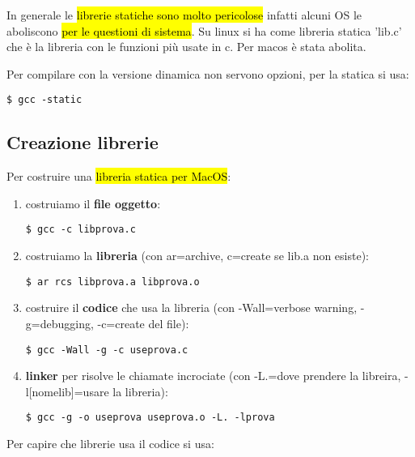 In generale le \hl{librerie statiche sono molto pericolose} infatti alcuni OS le aboliscono \hl{per le questioni di sistema}. Su linux si ha come libreria statica 'lib.c' che è la libreria con le funzioni più usate in c. Per macos è stata abolita.

Per compilare con la versione dinamica non servono opzioni, per la statica si usa:

\begin{lstlisting}
$ gcc -static
\end{lstlisting}


\subsection{Creazione librerie}

Per costruire una \hl{libreria statica per MacOS}:

\begin{enumerate}
	\item costruiamo il \textbf{file oggetto}:

\begin{lstlisting}
$ gcc -c libprova.c
\end{lstlisting}
		
	\item costruiamo la \textbf{libreria} (con ar=archive, c=create se lib.a non esiste):

\begin{lstlisting}
$ ar rcs libprova.a libprova.o
\end{lstlisting}
			
	\item costruire il \textbf{codice} che usa la libreria (con -Wall=verbose warning, -g=debugging, -c=create del file):

\begin{lstlisting}
$ gcc -Wall -g -c useprova.c
\end{lstlisting}
	
	\item \textbf{linker} per risolve le chiamate incrociate (con -L.=dove prendere la libreira, -l[nomelib]=usare la libreria):

\begin{lstlisting}
$ gcc -g -o useprova useprova.o -L. -lprova 
\end{lstlisting}

\end{enumerate}

Per capire che librerie usa il codice si usa:

